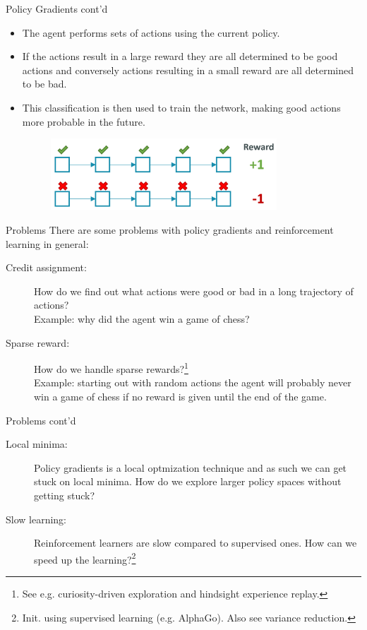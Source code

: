 \documentclass{beamer}
\begin{document}
\begin{frame}{Policy Gradients cont'd}
  \begin{itemize}
  \item The agent performs sets of actions using the current policy.
  \item If the actions result in a large reward they are all determined to be good actions and conversely actions resulting in a small reward are all determined to be bad.
  \item This classification is then used to train the network, making good actions more probable in the future.
  \begin{figure}
    \centering
    \includegraphics[width=0.8\textwidth]{trajectory_of_actions.png}
  \end{figure}
  \end{itemize}
\end{frame}

\begin{frame}{Problems}
  There are some problems with policy gradients and reinforcement learning in general:
  \begin{description}
  \item[Credit assignment:] How do we find out what actions were good or bad in a long trajectory of actions?\\
  Example: why did the agent win a game of chess?
  \item[Sparse reward:] How do we handle sparse rewards?\footnote{See e.g. curiosity-driven exploration and hindsight experience replay.}\\
  Example: starting out with random actions the agent will probably never win a game of chess if no reward is given until the end of the game.
  \end{description}
\end{frame}

\begin{frame}{Problems cont'd}
  \begin{description}
  \item[Local minima:] Policy gradients is a local optmization technique and as such we can get stuck on local minima. How do we explore larger policy spaces without getting stuck?
  \item[Slow learning:] Reinforcement learners are slow compared to supervised ones. How can we speed up the learning?\footnote{Init. using supervised learning (e.g. AlphaGo). Also see variance reduction.}
  \end{description}
\end{frame}
\end{document}
